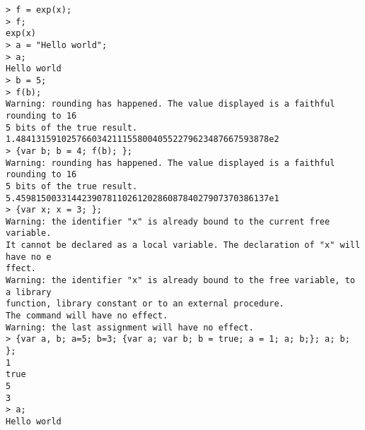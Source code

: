 \begin{center}\begin{minipage}{15cm}\begin{Verbatim}[frame=single]
> f = exp(x);
> f;
exp(x)
> a = "Hello world";
> a;
Hello world
> b = 5;
> f(b);
Warning: rounding has happened. The value displayed is a faithful rounding to 16
5 bits of the true result.
1.48413159102576603421115580040552279623487667593878e2
> {var b; b = 4; f(b); };
Warning: rounding has happened. The value displayed is a faithful rounding to 16
5 bits of the true result.
5.45981500331442390781102612028608784027907370386137e1
> {var x; x = 3; };
Warning: the identifier "x" is already bound to the current free variable.
It cannot be declared as a local variable. The declaration of "x" will have no e
ffect.
Warning: the identifier "x" is already bound to the free variable, to a library 
function, library constant or to an external procedure.
The command will have no effect.
Warning: the last assignment will have no effect.
> {var a, b; a=5; b=3; {var a; var b; b = true; a = 1; a; b;}; a; b; };
1
true
5
3
> a;
Hello world
\end{Verbatim}
\end{minipage}\end{center}

